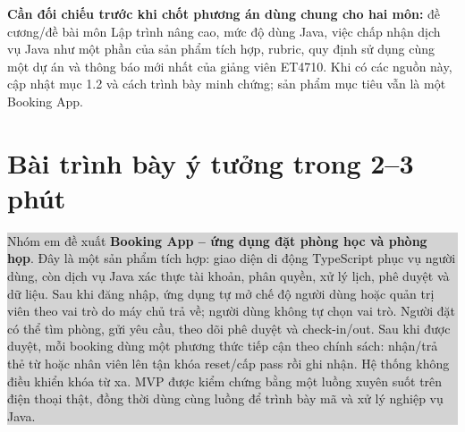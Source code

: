 \documentclass[12pt,a4paper]{article}
\begin{document}
\textbf{Cần đối chiếu trước khi chốt phương án dùng chung cho hai môn:} đề cương/đề bài môn Lập trình nâng cao, mức độ dùng Java, việc chấp nhận dịch vụ Java như một phần của sản phẩm tích hợp, rubric, quy định sử dụng cùng một dự án và thông báo mới nhất của giảng viên ET4710. Khi có các nguồn này, cập nhật mục 1.2 và cách trình bày minh chứng; sản phẩm mục tiêu vẫn là một Booking App.

\section{Bài trình bày ý tưởng trong 2--3 phút}

\colorbox{lightgray}{%
  \parbox{0.965\textwidth}{\small
  Nhóm em đề xuất \textbf{Booking App -- ứng dụng đặt phòng học và phòng họp}. Đây là một sản phẩm tích hợp: giao diện di động TypeScript phục vụ người dùng, còn dịch vụ Java xác thực tài khoản, phân quyền, xử lý lịch, phê duyệt và dữ liệu. Sau khi đăng nhập, ứng dụng tự mở chế độ người dùng hoặc quản trị viên theo vai trò do máy chủ trả về; người dùng không tự chọn vai trò. Người đặt có thể tìm phòng, gửi yêu cầu, theo dõi phê duyệt và check-in/out. Sau khi được duyệt, mỗi booking dùng một phương thức tiếp cận theo chính sách: nhận/trả thẻ từ hoặc nhân viên lên tận khóa reset/cấp pass rồi ghi nhận. Hệ thống không điều khiển khóa từ xa. MVP được kiểm chứng bằng một luồng xuyên suốt trên điện thoại thật, đồng thời dùng cùng luồng để trình bày mã và xử lý nghiệp vụ Java.}}
\end{document}
